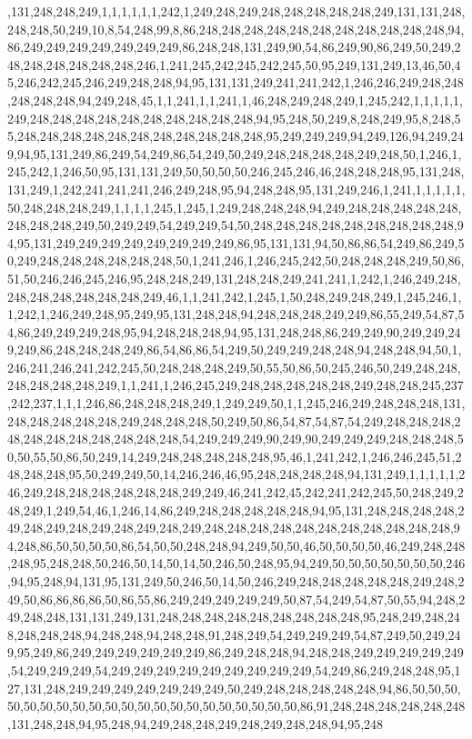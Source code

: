 ,131,248,248,249,1,1,1,1,1,1,242,1,249,248,249,248,248,248,248,248,249,131,131,248,248,248,50,249,10,8,54,248,99,8,86,248,248,248,248,248,248,248,248,248,248,248,94,86,249,249,249,249,249,249,249,86,248,248,131,249,90,54,86,249,90,86,249,50,249,248,248,248,248,248,248,246,1,241,245,242,245,242,245,50,95,249,131,249,13,46,50,45,246,242,245,246,249,248,248,94,95,131,131,249,241,241,242,1,246,246,249,248,248,248,248,248,94,249,248,45,1,1,241,1,1,241,1,46,248,249,248,249,1,245,242,1,1,1,1,1,249,248,248,248,248,248,248,248,248,248,248,94,95,248,50,249,8,248,249,95,8,248,55,248,248,248,248,248,248,248,248,248,248,248,95,249,249,249,94,249,126,94,249,249,94,95,131,249,86,249,54,249,86,54,249,50,249,248,248,248,248,249,248,50,1,246,1,245,242,1,246,50,95,131,131,249,50,50,50,50,246,245,246,46,248,248,248,95,131,248,131,249,1,242,241,241,241,246,249,248,95,94,248,248,95,131,249,246,1,241,1,1,1,1,1,50,248,248,248,249,1,1,1,1,245,1,245,1,249,248,248,248,94,249,248,248,248,248,248,248,248,248,249,50,249,249,54,249,249,54,50,248,248,248,248,248,248,248,248,248,94,95,131,249,249,249,249,249,249,249,249,86,95,131,131,94,50,86,86,54,249,86,249,50,249,248,248,248,248,248,248,50,1,241,246,1,246,245,242,50,248,248,248,249,50,86,51,50,246,246,245,246,95,248,248,249,131,248,248,249,241,241,1,242,1,246,249,248,248,248,248,248,248,248,249,46,1,1,241,242,1,245,1,50,248,249,248,249,1,245,246,1,1,242,1,246,249,248,95,249,95,131,248,248,94,248,248,248,249,249,86,55,249,54,87,54,86,249,249,249,248,95,94,248,248,248,94,95,131,248,248,86,249,249,90,249,249,249,249,86,248,248,248,249,86,54,86,86,54,249,50,249,249,248,248,94,248,248,94,50,1,246,241,246,241,242,245,50,248,248,248,249,50,55,50,86,50,245,246,50,249,248,248,248,248,248,248,249,1,1,241,1,246,245,249,248,248,248,248,248,249,248,248,245,237,242,237,1,1,1,246,86,248,248,248,249,1,249,249,50,1,1,245,246,249,248,248,248,131,248,248,248,248,248,249,248,248,248,50,249,50,86,54,87,54,87,54,249,248,248,248,248,248,248,248,248,248,248,248,54,249,249,249,90,249,90,249,249,249,248,248,248,50,50,55,50,86,50,249,14,249,248,248,248,248,248,95,46,1,241,242,1,246,246,245,51,248,248,248,95,50,249,249,50,14,246,246,46,95,248,248,248,248,94,131,249,1,1,1,1,1,246,249,248,248,248,248,248,248,249,249,46,241,242,45,242,241,242,245,50,248,249,248,249,1,249,54,46,1,246,14,86,249,248,248,248,248,248,94,95,131,248,248,248,248,249,248,249,248,249,248,249,248,249,248,248,248,248,248,248,248,248,248,248,248,94,248,86,50,50,50,50,86,54,50,50,248,248,94,249,50,50,46,50,50,50,50,46,249,248,248,248,95,248,248,50,246,50,14,50,14,50,246,50,248,95,94,249,50,50,50,50,50,50,50,246,94,95,248,94,131,95,131,249,50,246,50,14,50,246,249,248,248,248,248,248,249,248,249,50,86,86,86,86,50,86,55,86,249,249,249,249,249,50,87,54,249,54,87,50,55,94,248,249,248,248,131,131,249,131,248,248,248,248,248,248,248,248,248,95,248,249,248,248,248,248,248,94,248,248,94,248,248,91,248,249,54,249,249,249,54,87,249,50,249,249,95,249,86,249,249,249,249,249,249,86,249,248,248,94,248,248,249,249,249,249,249,54,249,249,249,54,249,249,249,249,249,249,249,249,249,54,249,86,249,248,248,95,127,131,248,249,249,249,249,249,249,249,50,249,248,248,248,248,248,94,86,50,50,50,50,50,50,50,50,50,50,50,50,50,50,50,50,50,50,50,50,50,86,91,248,248,248,248,248,248,131,248,248,94,95,248,94,249,248,248,249,248,249,248,248,94,95,248